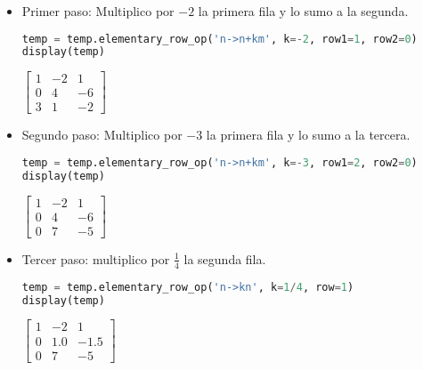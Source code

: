 \documentclass[a4,11pt]{aleph-notas}
\begin{document}
\begin{itemize}
\item
    Primer paso: Multiplico por \(-2\) la primera fila y lo sumo a la segunda.
\begin{pycodigo}
    \begin{ipynbcodigo}\begin{lstlisting}[language=Python]
temp = temp.elementary_row_op('n->n+km', k=-2, row1=1, row2=0)
display(temp)
    \end{lstlisting}\end{ipynbcodigo}
    \begin{ipynbsalida}[2mm]
$\displaystyle \left[\begin{matrix}1 & -2 & 1\\0 & 4 & -6\\3 & 1 & -2\end{matrix}\right]$
    \end{ipynbsalida}
\end{pycodigo}

\item
    Segundo paso: Multiplico por \(-3\) la primera fila y lo sumo a la tercera.
\begin{pycodigo}
    \begin{ipynbcodigo}\begin{lstlisting}[language=Python]
temp = temp.elementary_row_op('n->n+km', k=-3, row1=2, row2=0)
display(temp)
    \end{lstlisting}\end{ipynbcodigo}
    \begin{ipynbsalida}[2mm]
$\displaystyle \left[\begin{matrix}1 & -2 & 1\\0 & 4 & -6\\0 & 7 & -5\end{matrix}\right]$
    \end{ipynbsalida}
\end{pycodigo}

\item
    Tercer paso: multiplico por \(\frac{1}{4}\) la segunda fila.
\begin{pycodigo}
    \begin{ipynbcodigo}\begin{lstlisting}[language=Python]
temp = temp.elementary_row_op('n->kn', k=1/4, row=1)
display(temp)
    \end{lstlisting}\end{ipynbcodigo}
    \begin{ipynbsalida}[2mm]
$\displaystyle \left[\begin{matrix}1 & -2 & 1\\0 & 1.0 & -1.5\\0 & 7 & -5\end{matrix}\right]$
    \end{ipynbsalida}
\end{pycodigo}


\end{itemize}
\end{document}
